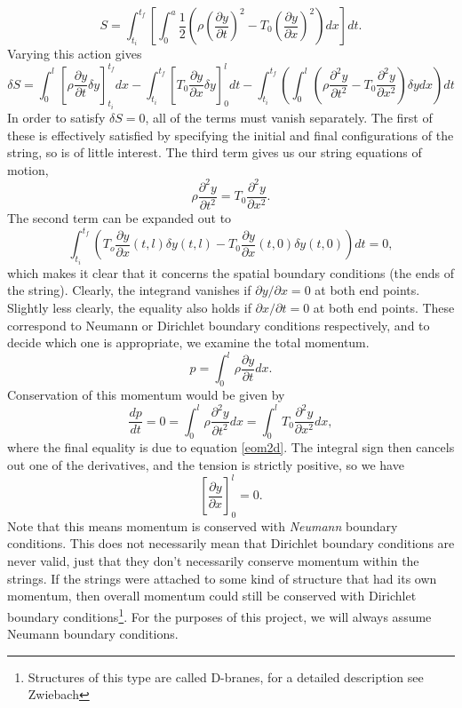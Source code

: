 \documentclass[a4paper,12pt]{article}
\numberwithin{equation}{section}
\begin{document}
\begin{equation}
S = \int_{t_i}^{t_f} \left[ \int_0^a \frac{1}{2}  \left( \rho  \left( \frac{\partial y}{\partial t} \right)^2 -   T_0 \left( \frac{\partial y}{\partial x} \right) ^2 \right) dx \right] dt.
\end{equation}
Varying this action gives 
\begin{equation}
\delta S = \int_0^l \left[ \rho \frac{\partial y}{\partial t} \delta y\right]_{t_i}^{t_f} dx -  \int_{t_i}^{t_f} \left[T_0\frac{\partial y}{\partial x} \delta y \right]_0^l dt - \int_{t_i}^{t_f} \left( \int_0^l \left( \rho \frac{\partial ^2 y}{\partial t^2} -T_0 \frac{\partial ^2 y}{\partial x^2}\right)\delta y dx \right) dt
\end{equation}
In order to satisfy $\delta S = 0$, all of the terms must vanish separately. The first of these is effectively satisfied by specifying the initial and final configurations of the string, so is of little interest. 
The third term gives us our string equations of motion, 
\begin{equation}\label{eom2d}
\rho \frac{\partial ^2y}{\partial t^2} = T_0 \frac{\partial ^2 y}{\partial x^2}.
\end{equation}
The second term can be expanded out to 
\begin{equation}
\int_{t_i}^{t_f}\left(T_o \frac{\partial y}{\partial x}(t,l)\delta y(t,l) - T_0 \frac{\partial y}{\partial x}(t,0)\delta y(t,0)\right) dt = 0,
\end{equation}
which makes it clear that it concerns the spatial boundary conditions (the ends of the string). Clearly, the integrand vanishes if $\partial y/\partial x =0$ at both end points. Slightly less clearly, the equality also holds if $\partial x/\partial t =0$ at both end points. These correspond to Neumann or Dirichlet boundary conditions respectively, and to decide which one is appropriate, we examine the total momentum. 
\begin{equation}
p = \int_0^l \rho \frac{\partial y}{\partial t} dx.
\end{equation}
Conservation of this momentum would be given by
\begin{equation}
\frac{dp}{dt} = 0 = \int_0^l \rho \frac{\partial ^2y}{\partial t^2} dx = \int_0^l T_0 \frac{\partial^2 y}{\partial x^2} dx,
\end{equation}
where the final equality is due to equation \ref{eom2d}. The integral sign then cancels out one of the derivatives, and the tension is strictly positive, so we have  
\begin{equation}
\left[ \frac{\partial y}{\partial x} \right]_0^l = 0.
\end{equation}
Note that this means momentum is conserved with \emph{Neumann} boundary conditions. This does not necessarily mean that Dirichlet boundary conditions are never valid, just that they don't necessarily conserve momentum within the strings. If the strings were attached to some kind of structure that had its own momentum, then overall momentum could still be conserved with Dirichlet boundary conditions\footnote{Structures of this type are called D-branes, for a detailed description see Zwiebach\cite{zwiebach}}.  For the purposes of this project, we will always assume Neumann boundary conditions.
\end{document}
